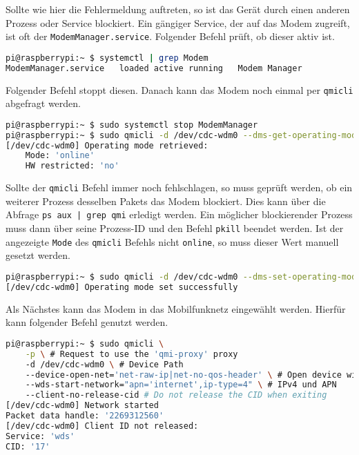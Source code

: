 \noindent Sollte wie hier die Fehlermeldung auftreten, so ist das Gerät durch einen anderen Prozess oder Service blockiert.
Ein gängiger Service, der auf das Modem zugreift, ist oft der \texttt{ModemManager.service}.
Folgender Befehl prüft, ob dieser aktiv ist.

\begin{lstlisting}[language=Bash]
pi@raspberrypi:~ $ systemctl | grep Modem
ModemManager.service   loaded active running   Modem Manager
\end{lstlisting}

\noindent Folgender Befehl stoppt diesen.
Danach kann das Modem noch einmal per \texttt{qmicli} abgefragt werden.

\begin{lstlisting}[language=Bash]
pi@raspberrypi:~ $ sudo systemctl stop ModemManager
pi@raspberrypi:~ $ sudo qmicli -d /dev/cdc-wdm0 --dms-get-operating-mode
[/dev/cdc-wdm0] Operating mode retrieved:
	Mode: 'online'
	HW restricted: 'no'
\end{lstlisting}

\noindent Sollte der \texttt{qmicli} Befehl immer noch fehlschlagen, so muss geprüft werden, ob ein weiterer Prozess desselben
Pakets das Modem blockiert. 
Dies kann über die Abfrage \texttt{ps aux | grep qmi} erledigt werden.
Ein möglicher blockierender Prozess muss dann über seine Prozess-ID und den Befehl \texttt{pkill} beendet werden.
Ist der angezeigte \texttt{Mode} des \texttt{qmicli} Befehls nicht \texttt{online}, so muss dieser Wert manuell gesetzt
werden.

\begin{lstlisting}[language=Bash]
pi@raspberrypi:~ $ sudo qmicli -d /dev/cdc-wdm0 --dms-set-operating-mode='online'
[/dev/cdc-wdm0] Operating mode set successfully
\end{lstlisting}



Als Nächstes kann das Modem in das Mobilfunknetz eingewählt werden.
Hierfür kann folgender Befehl genutzt werden.

\begin{lstlisting}[language=Bash]
pi@raspberrypi:~ $ sudo qmicli \
    -p \ # Request to use the 'qmi-proxy' proxy
    -d /dev/cdc-wdm0 \ # Device Path
    --device-open-net='net-raw-ip|net-no-qos-header' \ # Open device with specific link protocol and QoS flags
    --wds-start-network="apn='internet',ip-type=4" \ # IPv4 und APN
    --client-no-release-cid # Do not release the CID when exiting
[/dev/cdc-wdm0] Network started
Packet data handle: '2269312560'
[/dev/cdc-wdm0] Client ID not released:
Service: 'wds'
CID: '17'
\end{lstlisting}

